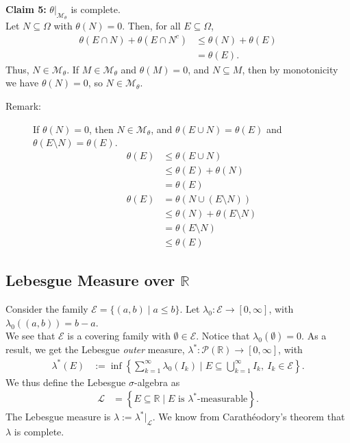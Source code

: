 \documentclass[10pt]{extarticle}
\newcommand{\R}{\mathbb{R}}
\begin{document}
\begin{description}
          \textbf{Claim 5:} $\theta|_{\mathcal{M}_{\theta}}$ is complete.\\

          Let $N\subseteq \Omega$ with $\theta(N) = 0$. Then, for all $E\subseteq \Omega$,
          \begin{align*}
            \theta(E\cap N) + \theta(E\cap N^{c}) &\leq \theta(N) + \theta(E)\\
                                                  &= \theta(E).
          \end{align*}
          Thus, $N\in \mathcal{M}_{\theta}$. If $M\in \mathcal{M}_{\theta}$ and $\theta(M) = 0$, and $N\subseteq M$, then by monotonicity we have $\theta(N) = 0$, so $N\in \mathcal{M}_{\theta}$.
  \end{description}
  \begin{description}
    \item[Remark:] If $\theta(N) = 0$, then $N\in \mathcal{M}_{\theta}$, and $\theta(E\cup N) = \theta(E)$ and $\theta(E\setminus N) = \theta(E)$.
      \begin{align*}
        \theta(E) &\leq \theta(E\cup N)\\
                  &\leq \theta(E) + \theta(N)\\
                  &= \theta(E)\\
        \theta(E) &= \theta(N \cup (E\setminus N))\\
                  &\leq \theta(N) + \theta(E\setminus N)\\
                  &= \theta(E\setminus N)\\
                  & \leq \theta(E)
      \end{align*}
  \end{description}
  \subsection{Lebesgue Measure over $\R$}%
  Consider the family $\mathcal{E} = \{(a,b) \mid a\leq b\}$. Let $\lambda_0: \mathcal{E}\rightarrow [0,\infty]$, with $\lambda_0((a,b)) = b-a$.\\

  We see that $\mathcal{E}$ is a covering family with $\emptyset \in \mathcal{E}$. Notice that $\lambda_0(\emptyset) = 0$. As a result, we get the Lebesgue \textit{outer} measure, $\lambda^{\ast}: \mathcal{P}(\R)\rightarrow [0,\infty]$, with
  \begin{align*}
    \lambda^{\ast}(E) &:= \inf\left\{\sum_{k=1}^{\infty}\lambda_0(I_k)\mid E\subseteq \bigcup_{k=1}^{\infty}I_k,~I_k\in\mathcal{E}\right\}.
  \end{align*}
  We thus define the Lebesgue $\sigma$-algebra as
  \begin{align*}
    \mathcal{L} &= \left\{E\subseteq \R\mid E\text{ is $\lambda^{\ast}$-measurable}\right\}.
  \end{align*}
  The Lebesgue measure is $\lambda := \lambda^{\ast}|_{\mathcal{L}}$. We know from Carathéodory's theorem that $\lambda$ is complete.
\end{document}
